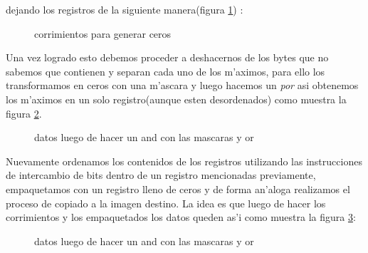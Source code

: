 dejando los registros de la siguiente manera(figura \ref{est:m-siete}) : \\
\begin{figure}[hb]
\caption{corrimientos para generar ceros}
\label{est:m-siete}
\end{figure}
Una vez logrado esto debemos proceder a deshacernos de los bytes que no sabemos que contienen y separan
cada uno de los m'aximos, para ello los transformamos en ceros con una m'ascara y luego hacemos un \textit{por} 
asi obtenemos los m'aximos en un solo registro(aunque esten desordenados) como muestra la figura \ref{est:m-ocho}.\\
\begin{figure}[hb]
\caption{datos luego de hacer un and con las mascaras y or}
\label{est:m-ocho}
\end{figure}
Nuevamente ordenamos los contenidos de los registros utilizando las instrucciones de intercambio de bits
dentro de un registro mencionadas previamente, empaquetamos con un registro lleno de ceros
 y de forma an'aloga realizamos el proceso de copiado a la imagen destino. La idea es que luego de
hacer los corrimientos y los empaquetados los datos queden as'i como muestra la figura \ref{est:m-nueve}:\\
\begin{figure}[hb]
\caption{datos luego de hacer un and con las mascaras y or}
\label{est:m-nueve}
\end{figure}




 
 

